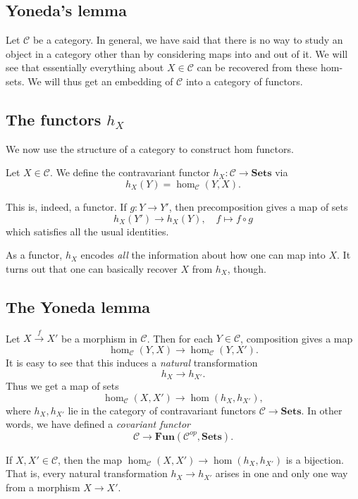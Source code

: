 \begin{proposition}
\section{Yoneda's lemma}


Let $\mathcal{C}$ be a category.
In general, we have said that there is no way to study an object in  a
category other than by considering maps into and out of it.
We will see that essentially everything about $X \in \mathcal{C}$ can be
recovered from these hom-sets.
We will thus get an embedding of $\mathcal{C}$ into a category of functors.

\subsection{The functors $h_X$}

We now use the structure of a category to construct hom functors.
\begin{definition}
Let $X \in \mathcal{C}$. We define the contravariant functor $h_X: \mathcal{C}
\to \mathbf{Sets}$ via
\[ h_X(Y) = \hom_{\mathcal{C}}(Y, X).  \]
\end{definition}

This is, indeed, a functor. If $g: Y \to Y'$, then precomposition gives a map
of sets
\[ h_X(Y') \to h_X(Y),  \quad f \mapsto f \circ g \]
which satisfies all the usual identities.

As a functor, $h_X$ encodes \emph{all} the information about
how one can map into $X$.
It turns out that one can basically recover $X$ from $h_X$, though.

\subsection{The Yoneda lemma}

Let $X \stackrel{f}{\to} X'$ be a morphism in $\mathcal{C}$.
Then for each $Y \in \mathcal{C}$, composition gives a map
\[ \hom_{\mathcal{C}}(Y, X) \to \hom_{\mathcal{C}}(Y, X').  \]
It is easy to see that this induces a \emph{natural} transformation
\[ h_{X} \to h_{X'}.  \]
Thus we get a map of sets
\[ \hom_{\mathcal{C}}(X, X') \to \hom(h_X, h_{X'}),  \]
where $h_X, h_{X'}$ lie in the category of contravariant functors $\mathcal{C}
\to \mathbf{Sets}$.
In other words, we have defined a \emph{covariant functor}
\[ \mathcal{C} \to \mathbf{Fun}(\mathcal{C}^{op}, \mathbf{Sets}).  \]

\begin{theorem} If $X, X' \in \mathcal{C}$, then the map
$\hom_{\mathcal{C}}(X, X') \to \hom(h_X, h_{X'})$ is a bijection. That is,
every natural transformation $h_X \to h_{X'}$ arises in one and only one way
from a morphism $X \to X'$.
\end{theorem}



\end{proposition}
